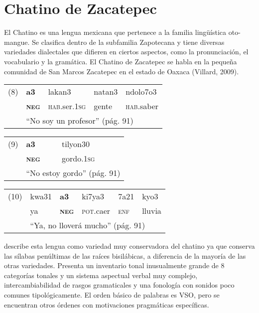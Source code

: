 \section*{Chatino de Zacatepec}

\noindent El Chatino es una lengua mexicana que pertenece a la familia lingüística oto-mangue. Se clasifica dentro de la subfamilia Zapotecana y tiene diversas variedades dialectales que difieren en ciertos aspectos, como la pronunciación, el vocabulario y la gramática. El Chatino de Zacatepec se habla en la pequeña comunidad de San Marcos Zacatepec en el estado de Oaxaca (Villard, 2009). \vspace{1cm}

{\setmainfont{Charis SIL}

\begin{tabular}{lllll}
(8) & \textbf{a3} & lakan3 & natan3 & ndolo7o3 \\
& \textsc{\textbf{neg}} & \textsc{hab}.ser.\textsc{1sg} & gente & \textsc{hab}.saber \\
& \multicolumn{4}{l}{“No soy un profesor” (pág. 91)}
\end{tabular} \vspace{0.5cm}

\begin{tabular}{lll}
(9) & \textbf{a3} & tilyon30 \\
& \textsc{\textbf{neg}} & gordo.\textsc{1sg} \\
& \multicolumn{2}{l}{“No estoy gordo” (pág. 91)} \\
\end{tabular} \vspace{0.5cm}

\begin{tabular}{llllll}
(10) & kwa31 & \textbf{a3} & ki7ya3 & 7a21 & kyo3 \\
& ya & \textsc{\textbf{neg}} & \textsc{pot}.caer & \textsc{enf} & lluvia \\
& \multicolumn{5}{l}{“Ya, no lloverá mucho” (pág. 91)}                
\end{tabular} \vspace{1cm}

} 

\textcolor{MidnightBlue}{\citet{chatino}} describe esta lengua como variedad muy conservadora del chatino ya que conserva las sílabas penúltimas de las raíces bisilábicas, a diferencia de la mayoría de las otras variedades. Presenta un inventario tonal inusualmente grande de 8 categorías tonales y un sistema aspectual verbal muy complejo, intercambiabilidad de rasgos gramaticales y una fonología con sonidos poco comunes tipológicamente. El orden básico de palabras es VSO, pero se encuentran otros órdenes con motivaciones pragmáticas específicas.

